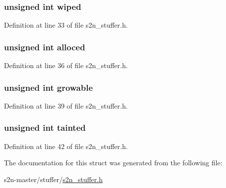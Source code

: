 \subsubsection[{\texorpdfstring{wiped}{wiped}}]{\setlength{\rightskip}{0pt plus 5cm}unsigned int wiped}\hypertarget{structs2n__stuffer_a245e885035adb556e385c8d954b95f5d}{}\label{structs2n__stuffer_a245e885035adb556e385c8d954b95f5d}


Definition at line 33 of file s2n\+\_\+stuffer.\+h.

\subsubsection[{\texorpdfstring{alloced}{alloced}}]{\setlength{\rightskip}{0pt plus 5cm}unsigned int alloced}\hypertarget{structs2n__stuffer_abd4e1fb5c5fa93adf354940b4040af52}{}\label{structs2n__stuffer_abd4e1fb5c5fa93adf354940b4040af52}


Definition at line 36 of file s2n\+\_\+stuffer.\+h.

\subsubsection[{\texorpdfstring{growable}{growable}}]{\setlength{\rightskip}{0pt plus 5cm}unsigned int growable}\hypertarget{structs2n__stuffer_a93b291fca0ee588e8a23b0f4463febbd}{}\label{structs2n__stuffer_a93b291fca0ee588e8a23b0f4463febbd}


Definition at line 39 of file s2n\+\_\+stuffer.\+h.

\subsubsection[{\texorpdfstring{tainted}{tainted}}]{\setlength{\rightskip}{0pt plus 5cm}unsigned int tainted}\hypertarget{structs2n__stuffer_aa8988f578e61c3dc7296cee547a3021d}{}\label{structs2n__stuffer_aa8988f578e61c3dc7296cee547a3021d}


Definition at line 42 of file s2n\+\_\+stuffer.\+h.



The documentation for this struct was generated from the following file\+:\begin{DoxyCompactItemize}
\item 
s2n-\/master/stuffer/\hyperlink{s2n__stuffer_8h}{s2n\+\_\+stuffer.\+h}\end{DoxyCompactItemize}
